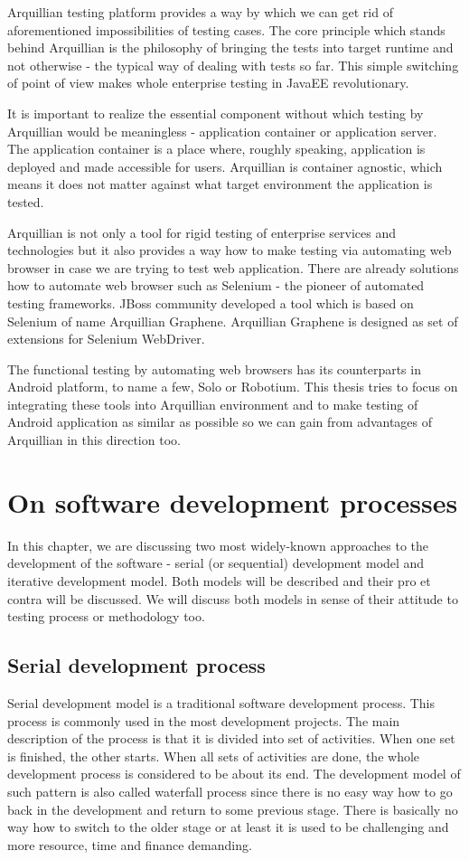 \documentclass[12pt,final,oneside]{fithesis}
\begin{document}
Arquillian testing platform provides a way by which we can get rid of aforementioned impossibilities of testing cases. The core principle which stands behind Arquillian is the philosophy of bringing the tests into target runtime and not otherwise - the typical way of dealing with tests so far. This simple switching of point of view makes whole enterprise testing in JavaEE revolutionary. 

It is important to realize the essential component without which testing by Arquillian would be meaningless - application container or application server. The application container is a place where, roughly speaking, application is deployed and made accessible for users. Arquillian is container agnostic, which means it does not matter against what target environment the application is tested.

Arquillian is not only a tool for rigid testing of enterprise services and technologies but it also provides a way how to make testing via automating web browser in case we are trying to test web application. There are already solutions how to automate web browser such as Selenium - the pioneer of automated testing frameworks. JBoss community developed a tool which is based on Selenium of name Arquillian Graphene. Arquillian Graphene is designed as set of extensions for Selenium WebDriver.

The functional testing by automating web browsers has its counterparts in Android platform, to name a few, Solo or Robotium. This thesis tries to focus on integrating these tools into Arquillian environment and to make testing of Android application as similar as possible so we can gain from advantages of Arquillian in this direction too. 

\chapter{On software development processes}

In this chapter, we are discussing two most widely-known approaches to the development of the software - serial (or sequential) development model and iterative development model. Both models will be described and their pro et contra will be discussed. We will discuss both models in sense of their attitude to testing process or methodology too.

	\section{Serial development process}
Serial development model is a traditional software development process. This process is commonly used in the most development projects. The main description of the process is that it is divided into set of activities. When one set is finished, the other starts. When all sets of activities are done, the whole development process is considered to be about its end. The development model of such pattern is also called waterfall process since there is no easy way how to go back in the development and return to some previous stage. There is basically no way how to switch to the older stage or at least it is used to be challenging and more resource, time and finance demanding.
\end{document}
